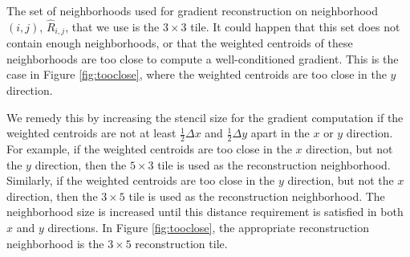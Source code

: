 The set of neighborhoods used for gradient reconstruction on neighborhood $(i,j)$, $\widehat R_{i,j}$, that we use is the $3 \times 3$ tile.
It could happen that this set does not contain enough neighborhoods, or that the weighted centroids of these neighborhoods are too close to compute a well-conditioned gradient.
This is the case in Figure \ref{fig:tooclose}, where the weighted centroids are too close in the $y$ direction.

We remedy this by increasing the stencil size for the gradient computation if the weighted centroids are not at least $\frac{1}{2}\Delta x$  and $\frac{1}{2}\Delta y$ apart in the $x$ or $y$ direction.
For example, if the weighted centroids are too close in the $x$ 
direction, but not the $y$ direction, then the $5\times 3$ tile is used as the 
reconstruction neighborhood.  Similarly, if the weighted centroids are too 
close in the $y$ direction, but not the $x$ direction, then the $3\times 5$ tile is 
used as the reconstruction neighborhood.  The neighborhood size is increased until this distance requirement is satisfied in both $x$ and $y$ directions.  In Figure \ref{fig:tooclose},
the appropriate reconstruction neighborhood is the $3\times 5$ reconstruction tile.


